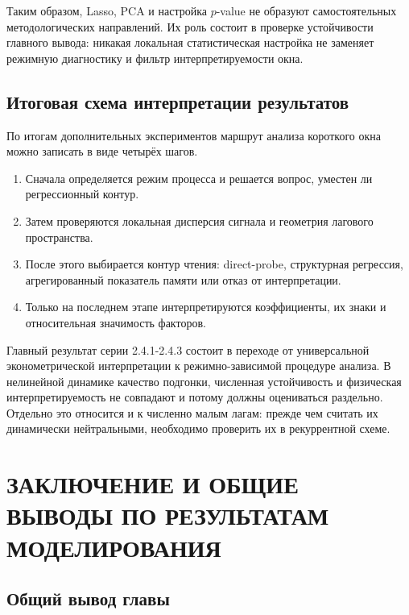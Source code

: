Таким образом, Lasso, PCA и настройка \(p\)-value не образуют самостоятельных методологических направлений. Их роль состоит в проверке устойчивости главного вывода: никакая локальная статистическая настройка не заменяет режимную диагностику и фильтр интерпретируемости окна.

\subsection*{Итоговая схема интерпретации результатов}
\label{sec:itogovaya-shema-interpretatsii-rezultatov}

По итогам дополнительных экспериментов маршрут анализа короткого окна можно записать в виде четырёх шагов.

\begin{enumerate}
\def\labelenumi{\arabic{enumi}.}
\tightlist
\item
  Сначала определяется режим процесса и решается вопрос, уместен ли регрессионный контур.
\item
  Затем проверяются локальная дисперсия сигнала и геометрия лагового пространства.
\item
  После этого выбирается контур чтения: direct-probe, структурная регрессия, агрегированный показатель памяти или отказ от интерпретации.
\item
  Только на последнем этапе интерпретируются коэффициенты, их знаки и относительная значимость факторов.
\end{enumerate}

Главный результат серии 2.4.1-2.4.3 состоит в переходе от универсальной эконометрической интерпретации к режимно-зависимой процедуре анализа. В нелинейной динамике качество подгонки, численная устойчивость и физическая интерпретируемость не совпадают и потому должны оцениваться раздельно. Отдельно это относится и к численно малым лагам: прежде чем считать их динамически нейтральными, необходимо проверить их в рекуррентной схеме.

\section{ЗАКЛЮЧЕНИЕ И ОБЩИЕ ВЫВОДЫ ПО РЕЗУЛЬТАТАМ МОДЕЛИРОВАНИЯ}
\label{sec:zaklyuchenie-i-obschie-vyvody-po-rezultatam-modelirovaniya}

\subsection{Общий вывод главы}
\label{sec:obschii-vyvod-glavy}


